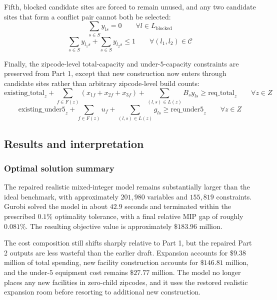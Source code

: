 \documentclass[11pt]{article}
\newcommand{\1}{\mathbb{I}}
\begin{document}
Fifth, blocked candidate sites are forced to remain unused, and any two candidate sites that form a conflict pair cannot both be selected:
\[
\sum_{s \in S} y_{ls} = 0
\qquad \forall l \in L_{\text{blocked}}
\]
\[
\sum_{s \in S} y_{l_1 s} + \sum_{s \in S} y_{l_2 s} \le 1
\qquad \forall (l_1,l_2) \in \mathcal{C}
\]

Finally, the zipcode-level total-capacity and under-\(5\)-capacity constraints are preserved from Part 1, except that new construction now enters through candidate sites rather than arbitrary zipcode-level build counts:
\[
\mathrm{existing\_total}_z
+
\sum_{f \in F(z)} (x_{1f}+x_{2f}+x_{3f})
+
\sum_{(l,s)\in L(z)} B_s y_{ls}
\ge \mathrm{req\_total}_z
\qquad \forall z \in Z
\]
\[
\mathrm{existing\_under5}_z
+
\sum_{f \in F(z)} u_f
+
\sum_{(l,s)\in L(z)} g_{ls}
\ge \mathrm{req\_under5}_z
\qquad \forall z \in Z
\]

\subsection{Results and interpretation}

\subsubsection{Optimal solution summary}

The repaired realistic mixed-integer model remains substantially larger than the ideal benchmark, with approximately \(201{,}980\) variables and \(155{,}819\) constraints. Gurobi solved the model in about \(42.9\) seconds and terminated within the prescribed \(0.1\%\) optimality tolerance, with a final relative MIP gap of roughly \(0.081\%\). The resulting objective value is approximately \(\$183.96\) million.

The cost composition still shifts sharply relative to Part 1, but the repaired Part 2 outputs are less wasteful than the earlier draft. Expansion accounts for \(\$9.38\) million of total spending, new facility construction accounts for \(\$146.81\) million, and the under-\(5\) equipment cost remains \(\$27.77\) million. The model no longer places any new facilities in zero-child zipcodes, and it uses the restored realistic expansion room before resorting to additional new construction.
\end{document}

